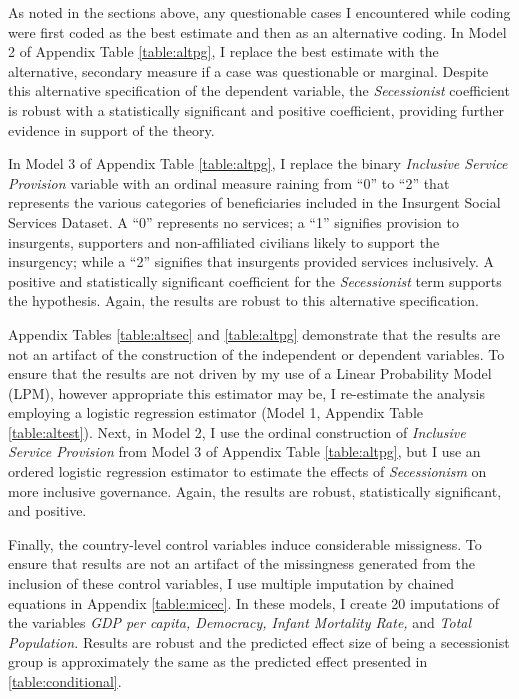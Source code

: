 \documentclass[12pt, letterpaper]{article}
\begin{document}
As noted in the sections above, any questionable cases I encountered while coding were first coded as the best estimate and then as an alternative coding. In Model 2 of Appendix Table \ref{table:altpg}, I replace the best estimate with the alternative, secondary measure if a case was questionable or marginal. Despite this alternative specification of the dependent variable, the \textit{Secessionist} coefficient is robust with a statistically significant and positive coefficient, providing further evidence in support of the theory.  

In Model 3 of Appendix Table \ref{table:altpg}, I replace the binary \textit{Inclusive Service Provision} variable with an ordinal measure raining from ``0'' to ``2'' that represents the various categories of beneficiaries included in the Insurgent Social Services Dataset. A ``0'' represents no services; a ``1'' signifies provision to insurgents, supporters and non-affiliated civilians likely to support the insurgency; while a ``2'' signifies that insurgents provided services inclusively. A positive and statistically significant coefficient for the \textit{Secessionist} term supports the hypothesis. Again, the results are robust to this alternative specification. 

Appendix Tables \ref{table:altsec} and \ref{table:altpg} demonstrate that the results are not an artifact of the construction of the independent or dependent variables. To ensure that the results are not driven by my use of a Linear Probability Model (LPM), however appropriate this estimator may be, I re-estimate the analysis employing a logistic regression estimator (Model 1, Appendix Table \ref{table:altest}). Next, in Model 2, I use the ordinal construction of \textit{Inclusive Service Provision} from Model 3 of Appendix Table \ref{table:altpg}, but I use an ordered logistic regression estimator to estimate the effects of \textit{Secessionism} on more inclusive governance.  Again, the results are robust, statistically significant, and positive. 

Finally, the country-level control variables induce considerable missigness. To ensure that results are not an artifact of the missingness generated from the inclusion of these control variables, I use multiple imputation by chained equations in Appendix \autoref{table:micec}. In these models, I create 20 imputations of the variables \textit{GDP per capita, Democracy, Infant Mortality Rate,} and \textit{Total Population.} Results are robust and the predicted effect size of being a secessionist group is approximately the same as the predicted effect presented in \autoref{table:conditional}. 
\end{document}
